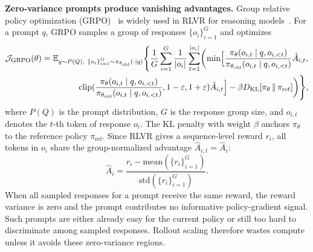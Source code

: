 \textbf{Zero-variance prompts produce vanishing advantages.}
Group relative policy optimization (GRPO)~\cite{shao2024deepseekmath} is widely used in RLVR for reasoning models~\cite{guo2025deepseek,yang2025qwen3technicalreport}. For a prompt $q$, GRPO samples a group of responses $\{o_i\}_{i=1}^G$ and optimizes
\begin{equation}
\label{eq:grpo}
\begin{aligned}
\mathcal{J}_{\mathrm{GRPO}}(\theta)
&=
\mathbb{E}_{\substack{
q \sim P(Q),\ \{o_i\}_{i=1}^{G} \sim \pi_{\theta_{\mathrm{old}}}(\cdot \mid q)
}}
\Biggl\{
\frac{1}{G}\sum_{i=1}^{G}\frac{1}{|o_i|}
\sum_{t=1}^{|o_i|}
\biggl(
\min \Bigl[
\frac{\pi_{\theta}(o_{i,t}\mid q,o_{i,<t})}{\pi_{\theta_{\mathrm{old}}}(o_{i,t}\mid q,o_{i,<t})}\hat{A}_{i,t}, \\
&\qquad\qquad\;
\operatorname{clip}(
\frac{\pi_{\theta}(o_{i,t}\mid q,o_{i,<t})}{\pi_{\theta_{\mathrm{old}}}(o_{i,t}\mid q,o_{i,<t})}, 1-\varepsilon, 1+\varepsilon
)\hat{A}_{i,t}
\Bigr]
-\beta D_{\mathrm{KL}}\!\left[
\pi_{\theta}\,\|\,\pi_{\mathrm{ref}}
\right]
\biggr)
\Biggr\},
\end{aligned}
\end{equation}
where $P(Q)$ is the prompt distribution, $G$ is the response group size, and $o_{i,t}$ denotes the $t$-th token
of response $o_i$. The KL penalty with weight $\beta$ anchors $\pi_\theta$ to the
reference policy $\pi_{\mathrm{ref}}$. Since RLVR gives a sequence-level reward $r_i$, all tokens in $o_i$
share the group-normalized advantage $\hat{A}_{i,t}=\hat{A}_{i}$:
\begin{equation}
\label{eq:grpo_advantage}
\hat{A}_{i} = \frac{r_i - \mathrm{mean}(\{r_i\}_{i=1}^G)}{\mathrm{std}(\{r_i\}_{i=1}^G)}.
\end{equation}
When all sampled responses for a prompt receive the same reward, the reward variance is zero and the prompt contributes no informative policy-gradient signal. Such prompts are either already easy for the current policy or still too hard to discriminate among sampled responses. Rollout scaling therefore wastes compute unless it avoids these zero-variance regions.

